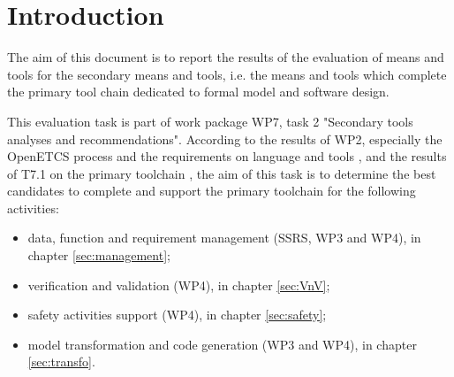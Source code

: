 

\chapter{Introduction}
\label{sec:intro}

The aim of this document is to report the results of the evaluation of means and tools for the secondary means and tools, i.e. the means and tools which complete the primary tool chain dedicated to formal model and software design.

This evaluation task is part of work package WP7, task 2 "Secondary  tools analyses and recommendations". According to the results of WP2, especially the OpenETCS process and the
requirements on language and tools \citep{D2_6}, and the results of T7.1 on the primary toolchain \citep{D7.1},  the aim of this task is to determine the best candidates to complete and support the primary toolchain for the following activities:

\begin{itemize}
\item data, function and requirement management (SSRS, WP3 and WP4), in chapter \ref{sec:management};
\item verification and  validation (WP4), in chapter \ref{sec:VnV};
\item safety activities support (WP4), in chapter \ref{sec:safety};
\item model transformation and code generation (WP3 and WP4), in chapter \ref{sec:transfo}.
\end{itemize}

  





